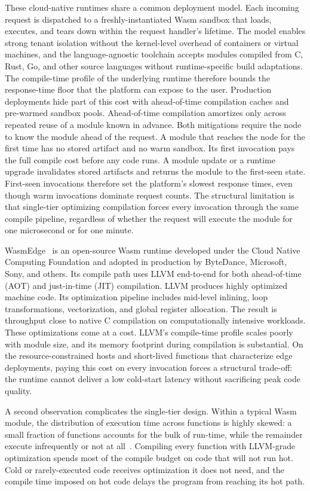 These cloud-native runtimes share a common deployment model. Each incoming request is dispatched to a freshly-instantiated Wasm sandbox that loads, executes, and tears down within the request handler's lifetime. The model enables strong tenant isolation without the kernel-level overhead of containers or virtual machines, and the language-agnostic toolchain accepts modules compiled from C, Rust, Go, and other source languages without runtime-specific build adaptations. The compile-time profile of the underlying runtime therefore bounds the response-time floor that the platform can expose to the user. Production deployments hide part of this cost with ahead-of-time compilation caches and pre-warmed sandbox pools. Ahead-of-time compilation amortizes only across repeated reuse of a module known in advance. Both mitigations require the node to know the module ahead of the request. A module that reaches the node for the first time has no stored artifact and no warm sandbox. Its first invocation pays the full compile cost before any code runs. A module update or a runtime upgrade invalidates stored artifacts and returns the module to the first-seen state. First-seen invocations therefore set the platform's slowest response times, even though warm invocations dominate request counts. The structural limitation is that single-tier optimizing compilation forces every invocation through the same compile pipeline, regardless of whether the request will execute the module for one microsecond or for one minute.

WasmEdge~\cite{wasmedge-docs} is an open-source Wasm runtime developed under the Cloud Native Computing Foundation and adopted in production by ByteDance, Microsoft, Sony, and others. Its compile path uses LLVM end-to-end for both ahead-of-time (AOT) and just-in-time (JIT) compilation. LLVM produces highly optimized machine code. Its optimization pipeline includes mid-level inlining, loop transformations, vectorization, and global register allocation. The result is throughput close to native C compilation on computationally intensive workloads. These optimizations come at a cost. LLVM's compile-time profile scales poorly with module size, and its memory footprint during compilation is substantial. On the resource-constrained hosts and short-lived functions that characterize edge deployments, paying this cost on every invocation forces a structural trade-off: the runtime cannot deliver a low cold-start latency without sacrificing peak code quality.

A second observation complicates the single-tier design. Within a typical Wasm module, the distribution of execution time across functions is highly skewed: a small fraction of functions accounts for the bulk of run-time, while the remainder execute infrequently or not at all~\cite{knuth1971empirical}. Compiling every function with LLVM-grade optimization spends most of the compile budget on code that will not run hot. Cold or rarely-executed code receives optimization it does not need, and the compile time imposed on hot code delays the program from reaching its hot path.

